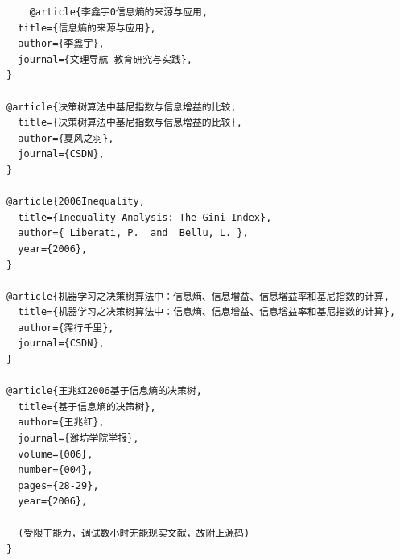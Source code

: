 \documentclass[lang=cn,11pt]{elegantpaper}
\begin{document}
\begin{lstlisting}
    @article{李鑫宇0信息熵的来源与应用,
  title={信息熵的来源与应用},
  author={李鑫宇},
  journal={文理导航 教育研究与实践},
}

@article{决策树算法中基尼指数与信息增益的比较,
  title={决策树算法中基尼指数与信息增益的比较},
  author={夏风之羽},
  journal={CSDN},
}

@article{2006Inequality,
  title={Inequality Analysis: The Gini Index},
  author={ Liberati, P.  and  Bellu, L. },
  year={2006},
}

@article{机器学习之决策树算法中：信息熵、信息增益、信息增益率和基尼指数的计算,
  title={机器学习之决策树算法中：信息熵、信息增益、信息增益率和基尼指数的计算},
  author={霈行千里},
  journal={CSDN},
}

@article{王兆红2006基于信息熵的决策树,
  title={基于信息熵的决策树},
  author={王兆红},
  journal={潍坊学院学报},
  volume={006},
  number={004},
  pages={28-29},
  year={2006},

  (受限于能力，调试数小时无能现实文献，故附上源码)
}
\end{lstlisting}
\end{document}
